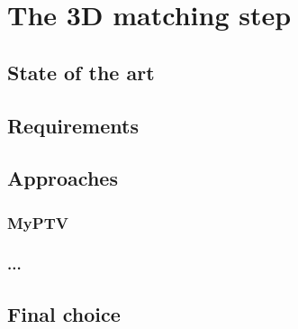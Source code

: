 \chapter{The 3D matching step}
\label{chap:matching}

\section{State of the art}
\section{Requirements}
\section{Approaches}
\subsection{MyPTV}
\subsection{...}
\section{Final choice}
